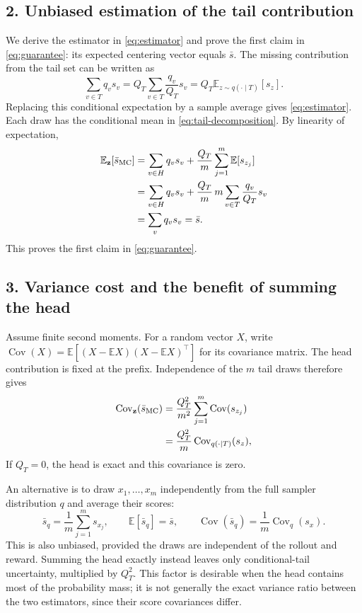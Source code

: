 \documentclass[10pt]{article}
\newcommand{\E}{\mathbb{E}}
\newcommand{\Cov}{\operatorname{Cov}}
\begin{document}
\subsection*{2. Unbiased estimation of the tail contribution}
\label{app:unbiased}
We derive the estimator in \eqref{eq:estimator} and prove the first claim in \eqref{eq:guarantee}: its expected centering vector equals $\bar s$. The missing contribution from the tail set can be written as
\begin{equation}\label{eq:tail-decomposition}
 \sum_{v\in T}q_vs_v
 =Q_T\sum_{v\in T}\frac{q_v}{Q_T}s_v
 =Q_T\E_{z\sim q(\cdot\mid T)}[s_z].
\end{equation}
Replacing this conditional expectation by a sample average gives \eqref{eq:estimator}. Each draw has the conditional mean in \eqref{eq:tail-decomposition}. By linearity of expectation,
\begin{equation}\label{eq:unbiased-proof}
\begin{aligned}
 \E_{\mathbf z}[\bar s_{\rm MC}]
 &=\sum_{v\in H}q_vs_v+\frac{Q_T}{m}\sum_{j=1}^m\E[s_{z_j}]\\
 &=\sum_{v\in H}q_vs_v+\frac{Q_T}{m}\,m\sum_{v\in T}\frac{q_v}{Q_T}s_v\\
 &=\sum_vq_vs_v=\bar s.
\end{aligned}
\end{equation}
This proves the first claim in \eqref{eq:guarantee}.

\subsection*{3. Variance cost and the benefit of summing the head}
\label{app:variance}
Assume finite second moments. For a random vector $X$, write
$\Cov(X)=\E[(X-\E X)(X-\E X)^\top]$ for its covariance matrix.
The head contribution is fixed at the prefix. Independence of the $m$ tail draws therefore gives
\begin{equation}
\begin{aligned}
 \Cov_{\mathbf z}(\bar s_{\rm MC})
 &=\frac{Q_T^2}{m^2}\sum_{j=1}^m\Cov(s_{z_j})\\
 &=\frac{Q_T^2}{m}\Cov_{q(\cdot\mid T)}(s_z),
\end{aligned}
\end{equation}
If $Q_T=0$, the head is exact and this covariance is zero.

An alternative is to draw $x_1,\ldots,x_m$ independently from the full sampler distribution $q$ and average their scores:
\begin{equation}
 \bar s_q=\frac1m\sum_{j=1}^m s_{x_j},\qquad
 \E[\bar s_q]=\bar s,\qquad
 \Cov(\bar s_q)=\frac1m\Cov_q(s_x).
\end{equation}
This is also unbiased, provided the draws are independent of the rollout and reward. Summing the head exactly instead leaves only conditional-tail uncertainty, multiplied by $Q_T^2$. This factor is desirable when the head contains most of the probability mass; it is not generally the exact variance ratio between the two estimators, since their score covariances differ.
\end{document}
